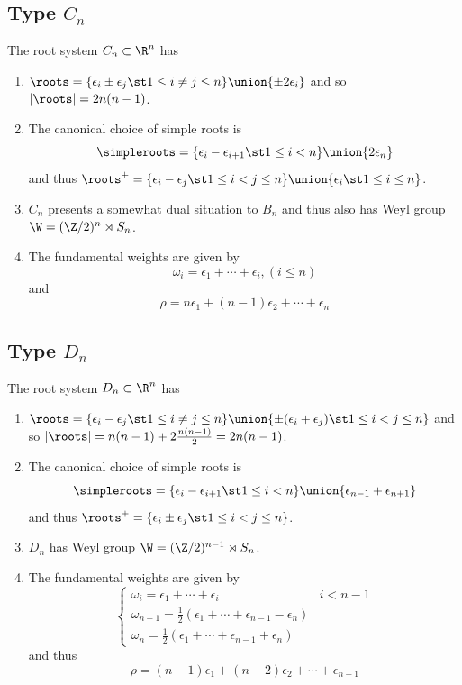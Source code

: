 \documentclass[11pt,leqno,oneside]{amsart}
\numberwithin{thm}{section}
\newcommand{\halfsum}{\rho}
\renewcommand{\Sym}{S}
\begin{document}
\subsection{Type \(C_n\)}
\begin{prop}
  The root system \(C_n \subset \R^n\) has
  \begin{enumerate}
  \item \(\roots = \{\epsilon_i \pm \epsilon_j \st 1 \leq i \neq j
    \leq n\} \union \{\pm 2 \epsilon_i\}\) and so \(|\roots| =
    2n(n-1)\).
  \item The canonical choice of simple roots is \[
      \simpleroots = \{\epsilon_i - \epsilon_{i+1} \st 1 \leq  i < n\}
      \union \{2 \epsilon_n\}
    \]
    and thus \(\roots^+ = \{\epsilon_i-\epsilon_j \st 1 \leq i < j
    \leq n\} \union \{\epsilon_i \st 1 \leq i \leq n\}\).
  \item \(C_n\) presents a somewhat dual situation to \(B_n\) and thus
    also has Weyl group \(\W = (\Z/2)^n \rtimes \Sym_n\).
  \item The fundamental weights are given by \[
      \omega_i = \epsilon_1 + \cdots + \epsilon_i, (i \leq n)
    \]
    and \[
      \halfsum = n \epsilon_1 + (n-1) \epsilon_2 + \cdots + \epsilon_n
    \]
  \end{enumerate}
\end{prop}
\subsection{Type \(D_n\)}
\begin{prop}
  The root system \(D_n \subset \R^n\) has
  \begin{enumerate}
  \item \(\roots = \{\epsilon_i - \epsilon_j \st 1 \leq i \neq j
    \leq n\} \union \{\pm(\epsilon_i + \epsilon_j) \st 1 \leq i < j
    \leq n\}\) and so \(|\roots| = n(n-1)+2\frac{n(n-1)}{2} =
    2n(n-1)\).
  \item The canonical choice of simple roots is \[
      \simpleroots = \{\epsilon_i - \epsilon_{i+1} \st 1 \leq i < n\}
      \union \{\epsilon_{n-1}+\epsilon_{n+1}\}
    \]
    and thus \(\roots^+ = \{\epsilon_i \pm \epsilon_j \st 1 \leq i < j
    \leq n\}\).
  \item \(D_n\) has Weyl group \(\W = (\Z/2)^{n-1} \rtimes \Sym_n\).
  \item The fundamental weights are given by \[
      \begin{cases}
        \omega_i = \epsilon_1 + \cdots + \epsilon_i & i < n-1\\
        \omega_{n-1} = \frac{1}{2}(\epsilon_1 + \cdots +
        \epsilon_{n-1} - \epsilon_n) \\
        \omega_n = \frac{1}{2}(\epsilon_1 + \cdots +
        \epsilon_{n-1}+\epsilon_n) 
      \end{cases}
    \]
    and thus \[
      \halfsum = (n-1) \epsilon_1 + (n-2) \epsilon_2 + \cdots +
      \epsilon_{n-1} 
    \]
  \end{enumerate}

\end{prop}
\end{document}
